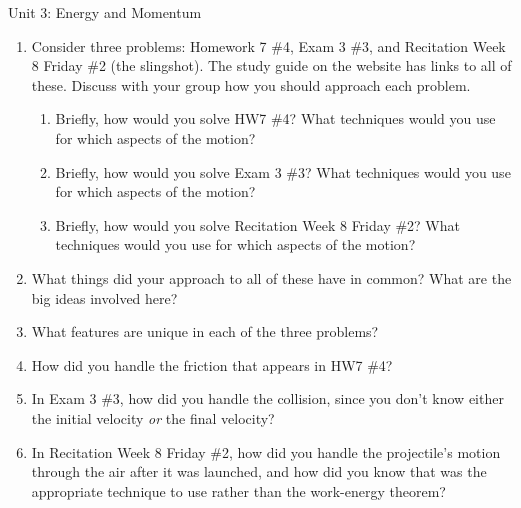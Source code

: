 \documentclass[12pt]{article}
\begin{document}
\begin{center}
	\Large Unit 3: Energy and Momentum
\end{center}
\begin{enumerate}
	\item Consider three problems: Homework 7 \#4, Exam 3 \#3, and Recitation Week 8 Friday \#2 (the slingshot). The study guide on the website has links to all of these. Discuss with your group how you should approach each problem.
	
	\begin{enumerate}
		\item Briefly, how would you solve HW7 \#4? What techniques would you use for which aspects of the motion?
		\vspace{1in}
		\item Briefly, how would you solve Exam 3 \#3? What techniques would you use for which aspects of the motion?
		\vspace{1in}
		\item Briefly, how would you solve  Recitation Week 8 Friday \#2? What techniques would you use for which aspects of the motion?
		\vspace{1in}
	\end{enumerate}
	\item What things did your approach to all of these have in common? What are the big ideas involved here?
	
	\newpage
	
	\item What features are unique in each of the three problems?
	
	\vspace{3in}
	
	\item How did you handle the friction that appears in HW7 \#4?
	
	\vspace{1.5in}
	
	\item In Exam 3 \#3, how did you handle the collision, since you don't know either the initial velocity {\it or} the final velocity?
	
	\vspace{1.5in}
	
	\item In   Recitation Week 8 Friday \#2, how did you handle the projectile's motion through the air after it was launched, and how did you know that was the appropriate technique to use rather than the work-energy theorem?
\end{enumerate}


 
\end{document}
